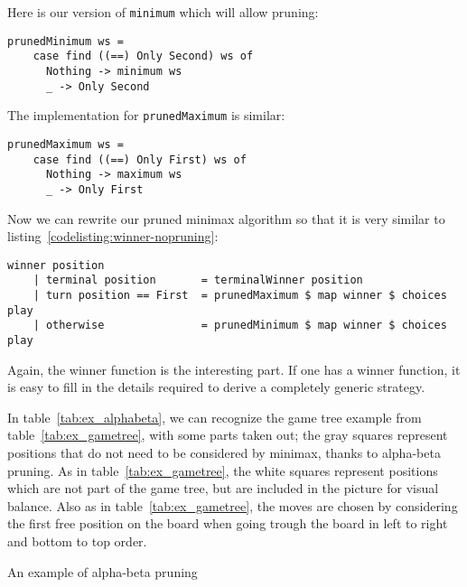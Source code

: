 Here is our version of \texttt{minimum} which will allow pruning:
\begin{lstlisting}[frame=single, label={codelisting:prunedminimum}]
  prunedMinimum ws = 
    case find ((==) Only Second) ws of
      Nothing -> minimum ws
      _ -> Only Second
\end{lstlisting}
The implementation for \texttt{prunedMaximum} is similar:
\begin{lstlisting}[frame=single, label={codelisting:prunedmaximum}]
  prunedMaximum ws = 
    case find ((==) Only First) ws of
      Nothing -> maximum ws
      _ -> Only First
\end{lstlisting}
Now we can rewrite our pruned minimax algorithm so that it is very similar to listing~\ref{codelisting:winner-nopruning}:

\begin{minipage}{\linewidth}
\begin{lstlisting}[frame=single, caption={Winner function (with pruning)}, label={codelisting:winner-pruning}]
  winner position
    | terminal position       = terminalWinner position
    | turn position == First  = prunedMaximum $ map winner $ choices play
    | otherwise               = prunedMinimum $ map winner $ choices play
\end{lstlisting}
\end{minipage}
Again, the winner function is the interesting part. If one has a winner function, it is easy to fill in the details required to derive a completely generic strategy.

In table~\ref{tab:ex_alphabeta}, we can recognize the game tree example from table~\ref{tab:ex_gametree}, with some parts taken out; the gray squares represent positions that do not need to be considered by minimax, thanks to alpha-beta pruning.
As in table~\ref{tab:ex_gametree}, the white squares represent positions which are not part of the game tree, but are included in the picture for visual balance.
Also as in table~\ref{tab:ex_gametree}, the moves are chosen by considering the first free position on the board when going trough the board in left to right and bottom to top order.

\begin{center}
\def\arraystretch{5.5}
\begin{table}
\def\svgwidth{\columnwidth} 
\caption{An example of alpha-beta pruning}
\label{tab:ex_alphabeta}
\end{table}
\end{center}
